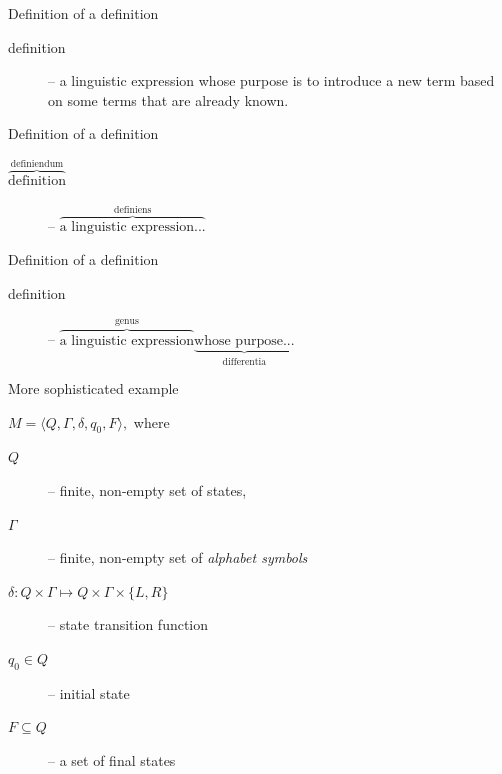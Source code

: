 \documentclass{beamer}
\begin{document}
\begin{frame}{Definition of a definition}

  \begin{description}
    \item [definition] -- a linguistic expression whose purpose is to
    introduce a new term based on some terms that are already known.
  \end{description}
  
\end{frame}

\begin{frame}{Definition of a definition}

  \begin{description}
  \item [$\overbrace{\text{definition}}^{\text{definiendum}}$]
    -- $\overbrace{\text{a linguistic expression...}}^{\text{definiens}}$
  \end{description}
  
\end{frame}

\begin{frame}{Definition of a definition}

  \begin{description}
  \item [definition]
    -- $\overbrace{\text{a linguistic expression}}^{\text{genus}}
    \underbrace{\text{whose purpose...}}_{\text{differentia}}$
  \end{description}
  
\end{frame}

\begin{frame}{More sophisticated example}

  $M=\langle Q,\Gamma,\delta,q_{0},F\rangle,$
  where
  \begin{description}
  \item [$Q$] -- finite, non-empty set of states,
  \item [$\Gamma$] -- finite, non-empty set of \textit{alphabet symbols}
  \item [$\delta : Q\times\Gamma\mapsto Q\times\Gamma\times\{L,R\}$]
    -- state transition function
  \item [$q_{0}\in Q$] -- initial state
  \item [$F\subseteq Q$] -- a set of final states
  \end{description}
  
\end{frame}
\end{document}
